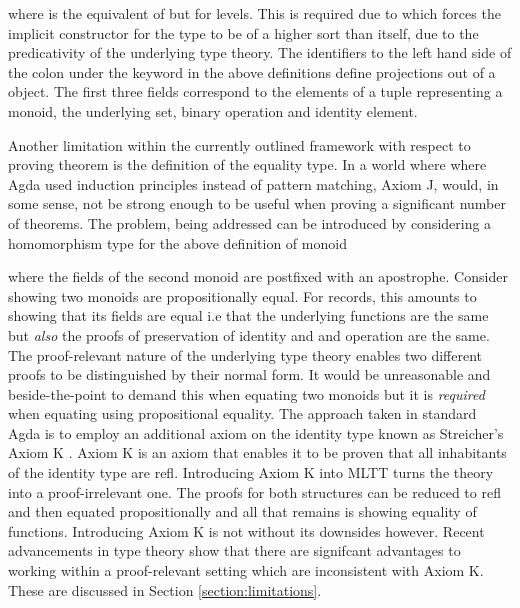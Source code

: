 
where  is the equivalent of  but for
levels. This is required due to \AgdaField{$\bullet$} which
forces the implicit constructor for the type to be of a higher sort than
 itself, due to the predicativity of the underlying type theory.
The identifiers to the left hand side of the colon under the 
keyword in the above definitions define projections out of a
 object. The first three fields correspond to the elements
of a tuple representing a monoid, the underlying set, binary operation and
identity element.

Another limitation within the currently outlined framework with respect to
proving theorem is the definition of the equality type. In a world where where
Agda used induction principles instead of pattern matching, \textsf{Axiom J},
would, in some sense, not be strong enough to be useful when proving a
significant number of theorems. The problem, being addressed can be introduced
by considering a homomorphism type for the above definition of monoid

\begin{AgdaMultiCode}
\end{AgdaMultiCode}

where the fields of the second monoid are postfixed with an apostrophe. Consider
showing two monoids are propositionally equal. For records, this amounts to
showing that its fields are equal i.e that the underlying functions are the
same but \textit{also} the proofs of preservation of identity and and operation
are the same. The proof-relevant nature of the underlying type theory enables
two different proofs to be distinguished by their normal form. It would be
unreasonable and beside-the-point to demand this when equating two monoids but
it is \textit{required} when equating using propositional equality. The
approach taken in standard Agda is to employ an additional axiom on the identity
type known as Streicher's \textsf{Axiom K} \cite{streicher1993investigations}.
\textsf{Axiom K} is an axiom that enables it to be proven that all inhabitants
of the identity type are \textsf{refl}. Introducing \textsf{Axiom K} into MLTT
turns the theory into a proof-irrelevant one. The proofs for both structures
can be reduced to refl and then equated propositionally and all that remains is
showing equality of functions. Introducing \textsf{Axiom K} is not without its
downsides however. Recent advancements in type theory \cite{hottbook}
show that there are signifcant advantages to working within a proof-relevant
setting which are inconsistent with \textsf{Axiom K}. These are discussed in
Section \ref{section:limitations}.

